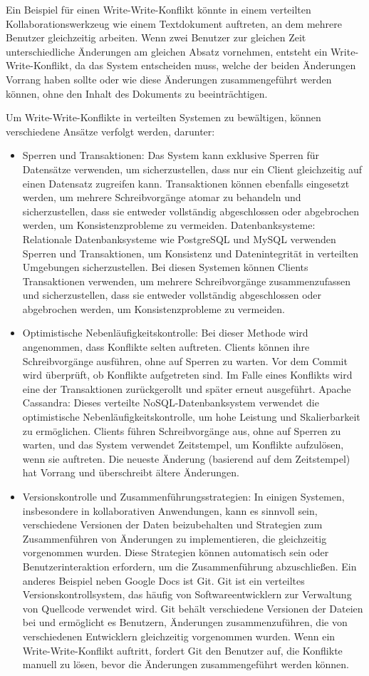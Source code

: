 \documentclass[../vs-script-first-v01.tex]{subfiles}
\begin{document}
Ein Beispiel für einen Write-Write-Konflikt könnte in einem verteilten Kollaborationswerkzeug wie einem Textdokument auftreten, an dem mehrere Benutzer gleichzeitig arbeiten. Wenn zwei Benutzer zur gleichen Zeit unterschiedliche Änderungen am gleichen Absatz vornehmen, entsteht ein Write-Write-Konflikt, da das System entscheiden muss, welche der beiden Änderungen Vorrang haben sollte oder wie diese Änderungen zusammengeführt werden können, ohne den Inhalt des Dokuments zu beeinträchtigen.

Um Write-Write-Konflikte in verteilten Systemen zu bewältigen, können verschiedene Ansätze verfolgt werden, darunter:
\begin{itemize}
\item Sperren und Transaktionen: Das System kann exklusive Sperren für Datensätze verwenden, um sicherzustellen, dass nur ein Client gleichzeitig auf einen Datensatz zugreifen kann. Transaktionen können ebenfalls eingesetzt werden, um mehrere Schreibvorgänge atomar zu behandeln und sicherzustellen, dass sie entweder vollständig abgeschlossen oder abgebrochen werden, um Konsistenzprobleme zu vermeiden.
Datenbanksysteme: Relationale Datenbanksysteme wie PostgreSQL und MySQL verwenden Sperren und Transaktionen, um Konsistenz und Datenintegrität in verteilten Umgebungen sicherzustellen. Bei diesen Systemen können Clients Transaktionen verwenden, um mehrere Schreibvorgänge zusammenzufassen und sicherzustellen, dass sie entweder vollständig abgeschlossen oder abgebrochen werden, um Konsistenzprobleme zu vermeiden.
\item Optimistische Nebenläufigkeitskontrolle: Bei dieser Methode wird angenommen, dass Konflikte selten auftreten. Clients können ihre Schreibvorgänge ausführen, ohne auf Sperren zu warten. Vor dem Commit wird überprüft, ob Konflikte aufgetreten sind. Im Falle eines Konflikts wird eine der Transaktionen zurückgerollt und später erneut ausgeführt.
Apache Cassandra: Dieses verteilte NoSQL-Datenbanksystem verwendet die optimistische Nebenläufigkeitskontrolle, um hohe Leistung und Skalierbarkeit zu ermöglichen. Clients führen Schreibvorgänge aus, ohne auf Sperren zu warten, und das System verwendet Zeitstempel, um Konflikte aufzulösen, wenn sie auftreten. Die neueste Änderung (basierend auf dem Zeitstempel) hat Vorrang und überschreibt ältere Änderungen.
\item Versionskontrolle und Zusammenführungsstrategien: In einigen Systemen, insbesondere in kollaborativen Anwendungen, kann es sinnvoll sein, verschiedene Versionen der Daten beizubehalten und Strategien zum Zusammenführen von Änderungen zu implementieren, die gleichzeitig vorgenommen wurden. Diese Strategien können automatisch sein oder Benutzerinteraktion erfordern, um die Zusammenführung abzuschließen.
Ein anderes Beispiel neben Google Docs ist Git. Git ist ein verteiltes Versionskontrollsystem, das häufig von Softwareentwicklern zur Verwaltung von Quellcode verwendet wird. Git behält verschiedene Versionen der Dateien bei und ermöglicht es Benutzern, Änderungen zusammenzuführen, die von verschiedenen Entwicklern gleichzeitig vorgenommen wurden. Wenn ein Write-Write-Konflikt auftritt, fordert Git den Benutzer auf, die Konflikte manuell zu lösen, bevor die Änderungen zusammengeführt werden können.
\end{itemize}
\end{document}
